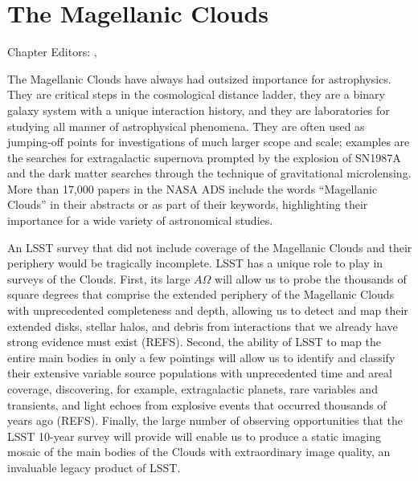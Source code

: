 
\chapter{The Magellanic Clouds}
\def\secname{\chpname:MCs}\label{sec:\secname}

Chapter Editors:
,

The Magellanic Clouds have always had outsized importance for
astrophysics.  They are critical steps in the cosmological distance
ladder, they are a binary galaxy system with a unique interaction
history, and they are laboratories for studying all manner of
astrophysical phenomena.  They are often used as jumping-off points
for investigations of much larger scope and scale; examples are the
searches for extragalactic supernova prompted by the explosion of
SN1987A and the dark matter searches through the technique of
gravitational microlensing.  More than 17,000 papers in the NASA ADS
include the words ``Magellanic Clouds'' in their abstracts or as part
of their keywords, highlighting their importance for a wide variety of
astronomical studies.

An LSST survey that did not include coverage of the Magellanic Clouds
and their periphery would be tragically incomplete.  LSST has a unique
role to play in surveys of the Clouds.  First, its large $A\Omega$
will allow us to probe the thousands of square degrees that comprise
the extended periphery of the Magellanic Clouds with unprecedented
completeness and depth, allowing us to detect and map their extended
disks, stellar halos, and debris from interactions that we already
have strong evidence must exist (REFS).  Second, the ability of LSST
to map the entire main bodies in only a few pointings will allow us to
identify and classify their extensive variable source populations with
unprecedented time and areal coverage, discovering, for example,
extragalactic planets, rare variables and transients, and light echoes
from explosive events that occurred thousands of years ago (REFS).
Finally, the large number of observing opportunities that the LSST
10-year survey will provide will enable us to produce a static imaging
mosaic of the main bodies of the Clouds with extraordinary image
quality, an invaluable legacy product of LSST.

